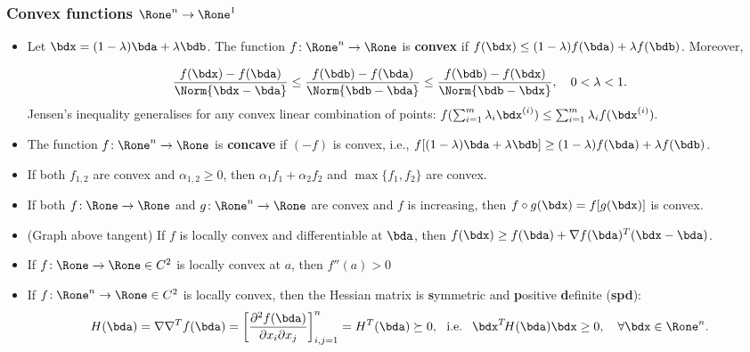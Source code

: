 \documentclass[a4paper]{article}
\begin{document}
\subsubsection*{Convex functions $\Rone^n\to\Rone^1$}%

\begin{itemize}
  \item Let $\bdx=(1-\lambda)\bda+\lambda\bdb$.
    The function
    $f\!:\Rone^n\to\Rone$ is \textbf{convex} if
    $
    f(\bdx)
    \le
    (1-\lambda) f(\bda)+\lambda f(\bdb)
    $.
    Moreover,

    \[
      \frac{f(\bdx)-f(\bda)}{\Norm{\bdx-\bda}}
      \le
      \frac{f(\bdb)-f(\bda)}{\Norm{\bdb-\bda}}
      \le
      \frac{f(\bdb)-f(\bdx)}{\Norm{\bdb-\bdx}},
      \quad 0 < \lambda < 1.
    \]
  Jensen's inequality generalises for any convex linear combination of points:
    $
    f(\sum_{i=1}^m\lambda_i\bdx^{(i)})
    \le
    \sum_{i=1}^m\lambda_i f(\bdx^{(i)}).
    $

   \item The function $f\!:\Rone^n\to\Rone$ is \textbf{concave} if $(-f)$ is convex, i.e.,
    $
    f[(1-\lambda)\bda+\lambda\bdb]
    \ge
    (1-\lambda) f(\bda)+\lambda f(\bdb)
    $.

  \item If both $f_{1,2}$ are convex and $\alpha_{1,2}\ge0$, then $\alpha_1f_1+\alpha_2 f_2$
    and $\max\{f_1,f_2\}$ are convex.

  \item If both
    $f\!:\Rone\to\Rone$
    and
    $g\!:\Rone^n\to\Rone$
    are convex and $f$ is increasing, then
    $f\circ g(\bdx)=f[g(\bdx)]$ is convex.

  \item (Graph above tangent) If $f$ is locally convex and differentiable at $\bda$, then
  $f(\bdx)\ge f(\bda)+\nabla f(\bda)^T(\bdx-\bda)$.

  \item If $f\!:\Rone\to\Rone\in C^2$ is locally convex at $a$, then $f''(a)>0$

  \item If $f\!:\Rone^n\to\Rone\in C^2$ is locally convex, then the
    Hessian matrix is \textbf{s}ymmetric and \textbf{p}ositive \textbf{d}efinite (\textbf{spd}):
    \[
      H(\bda)=\nabla\nabla^T f(\bda)
      =
      \left[\frac{\partial^2f(\bda)}{ \partial x_i\partial x_j}\right]_{i,j=1}^n
      =H^T(\bda)\succeq 0,
      ~\text{ i.e. }~
      \bdx^T\!H(\bda)\bdx\ge0,
      \quad \forall\bdx\in\Rone^n.
    \]

\end{itemize}
\end{document}
